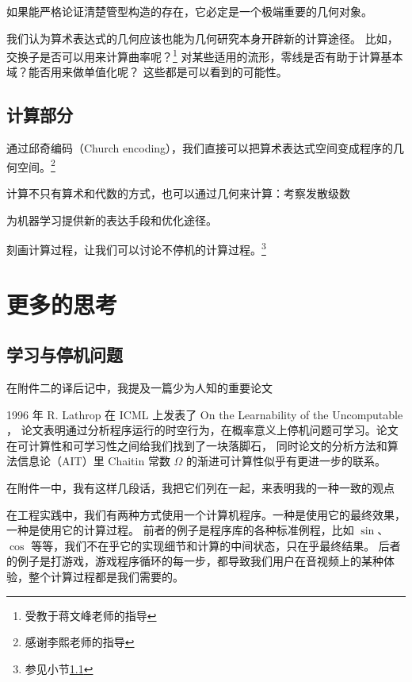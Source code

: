 \documentclass[a4paper,12pt]{article}
\numberwithin{problem}{section}
\numberwithin{definition}{section}
\numberwithin{lemma}{section}
\numberwithin{proposition}{section}
\numberwithin{theorem}{section}
\numberwithin{grammar}{section}
\numberwithin{program}{section}
\numberwithin{convention}{section}
\numberwithin{corollary}{section}
\begin{document}
如果能严格论证清楚管型构造的存在，它必定是一个极端重要的几何对象。

我们认为算术表达式的几何应该也能为几何研究本身开辟新的计算途径。
比如，交换子是否可以用来计算曲率呢？\footnote{受教于蒋文峰老师的指导}
对某些适用的流形，零线是否有助于计算基本域？能否用来做单值化呢？
这些都是可以看到的可能性。

\subsection{计算部分}

通过邱奇编码（Church encoding），我们直接可以把算术表达式空间变成程序的几何空间。\footnote{感谢李熙老师的指导}

计算不只有算术和代数的方式，也可以通过几何来计算：考察发散级数

为机器学习提供新的表达手段和优化途径。

刻画计算过程，让我们可以讨论不停机的计算过程。\footnote{参见小节\ref{sec:learnandhalt}}

\newpage

\section{更多的思考}

\subsection{学习与停机问题}\label{sec:learnandhalt}

在附件二的译后记中，我提及一篇少为人知的重要论文

\begin{displayquote}
1996 年 R. Lathrop 在 ICML 上发表了 On the Learnability of the Uncomputable ，
论文表明通过分析程序运行的时空行为，在概率意义上停机问题可学习。论文在可计算性和可学习性之间给我们找到了一块落脚石，
同时论文的分析方法和算法信息论（AIT）里 Chaitin 常数 $\Omega$ 的渐进可计算性似乎有更进一步的联系。
\end{displayquote}

在附件一中，我有这样几段话，我把它们列在一起，来表明我的一种一致的观点

\begin{displayquote}
在工程实践中，我们有两种方式使用一个计算机程序。一种是使用它的最终效果，一种是使用它的计算过程。
前者的例子是程序库的各种标准例程，比如 $\sin$、$\cos$ 等等，我们不在乎它的实现细节和计算的中间状态，只在乎最终结果。
后者的例子是打游戏，游戏程序循环的每一步，都导致我们用户在音视频上的某种体验，整个计算过程都是我们需要的。
\end{displayquote}
\end{document}
